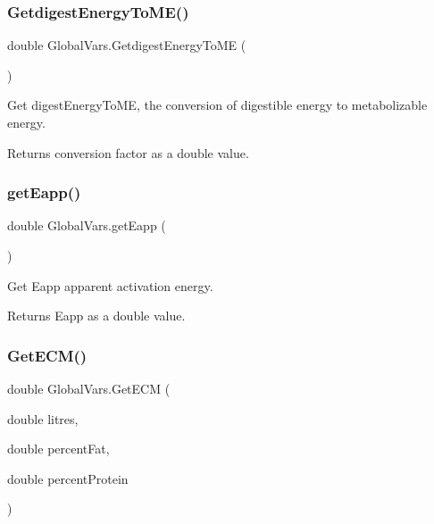 \subsubsection{\texorpdfstring{GetdigestEnergyToME()}{GetdigestEnergyToME()}}
{\footnotesize\ttfamily double Global\+Vars.\+Getdigest\+Energy\+To\+ME (\begin{DoxyParamCaption}{ }\end{DoxyParamCaption})\hspace{0.3cm}{\ttfamily [inline]}}



Get digest\+Energy\+To\+ME, the conversion of digestible energy to metabolizable energy. 

\begin{DoxyReturn}{Returns}
conversion factor as a double value. 
\end{DoxyReturn}
\mbox{\label{class_global_vars_af42c50c71b5cfd8c3569e9a0cfc78491}} 
\subsubsection{\texorpdfstring{getEapp()}{getEapp()}}
{\footnotesize\ttfamily double Global\+Vars.\+get\+Eapp (\begin{DoxyParamCaption}{ }\end{DoxyParamCaption})\hspace{0.3cm}{\ttfamily [inline]}}



Get Eapp apparent activation energy. 

\begin{DoxyReturn}{Returns}
Eapp as a double value. 
\end{DoxyReturn}
\mbox{\label{class_global_vars_a144881e0bebc34254f34b96109f0005d}} 
\subsubsection{\texorpdfstring{GetECM()}{GetECM()}}
{\footnotesize\ttfamily double Global\+Vars.\+Get\+E\+CM (\begin{DoxyParamCaption}\item[{double}]{litres,  }\item[{double}]{percent\+Fat,  }\item[{double}]{percent\+Protein }\end{DoxyParamCaption})\hspace{0.3cm}{\ttfamily [inline]}}



